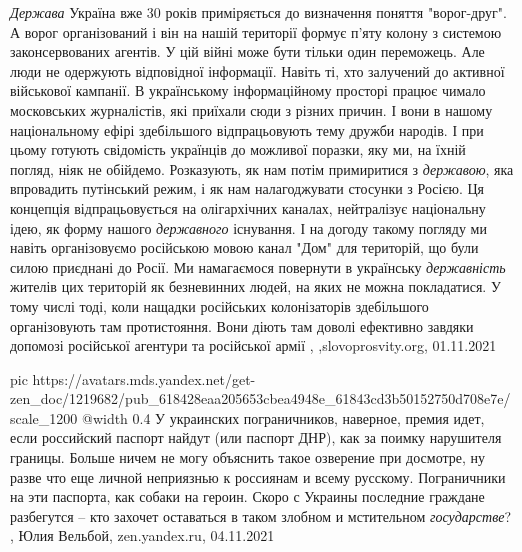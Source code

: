 \emph{Держава} Україна вже 30 років приміряється до визначення поняття
"ворог-друг". А ворог організований і він на нашій території формує п’яту
колону з системою законсервованих агентів. У цій війні може бути тільки один
переможець. Але люди не одержують відповідної інформації. Навіть ті, хто
залучений до активної військової кампанії.  В українському інформаційному
просторі працює чимало московських журналістів, які приїхали сюди з різних
причин. І вони в нашому національному ефірі здебільшого відпрацьовують тему
дружби народів. І при цьому готують свідомість українців до можливої поразки,
яку ми, на їхній погляд, ніяк не обійдемо. Розказують, як нам потім примиритися
з \emph{державою}, яка впровадить путінський режим, і як нам налагоджувати
стосунки з Росією. Ця концепція відпрацьовується на олігархічних каналах,
нейтралізує національну ідею, як форму нашого \emph{державного} існування. І на
догоду такому погляду ми навіть організовуємо російською мовою канал "Дом" для
територій, що були силою приєднані до Росії. Ми намагаємося повернути в
українську \emph{державність} жителів цих територій як безневинних людей, на
яких не можна покладатися. У тому числі тоді, коли нащадки російських
колонізаторів здебільшого організовують там протистояння. Вони діють там доволі
ефективно завдяки допомозі російської агентури та російської армії
, ,slovoprosvity.org, 01.11.2021

\ifcmt
  pic https://avatars.mds.yandex.net/get-zen_doc/1219682/pub_618428eaa205653cbea4948e_61843cd3b50152750d708e7e/scale_1200
  @width 0.4
\fi
У украинских пограничников, наверное, премия идет, если российский паспорт
найдут (или паспорт ДНР), как за поимку нарушителя границы. Больше ничем не
могу объяснить такое озверение при досмотре, ну разве что еще личной неприязнью
к россиянам и всему русскому. Пограничники на эти паспорта, как собаки на
героин. Скоро с Украины последние граждане разбегутся – кто захочет оставаться
в таком злобном и мстительном \emph{государстве}?
, Юлия Вельбой, zen.yandex.ru, 04.11.2021

